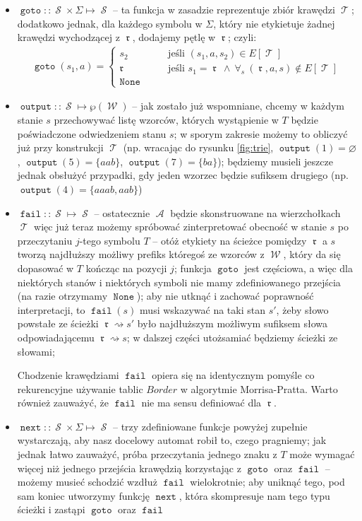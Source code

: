 \documentclass{article}
\let\emptyset\varnothing
\DeclareMathOperator{\rot}{\mathfrak{r}}
\DeclareMathOperator{\W}{\mathcal{W}}
\DeclareMathOperator{\A}{\mathcal{A}}
\DeclareMathOperator{\states}{\mathcal{S}}
\DeclareMathOperator{\trie}{\mathcal{T}}
\DeclareMathOperator{\goto}{\texttt{goto}}
\DeclareMathOperator{\next}{\texttt{next}}
\DeclareMathOperator{\fail}{\texttt{fail}}
\DeclareMathOperator{\out}{\texttt{output}}
\DeclareMathOperator{\none}{\texttt{None}}
\begin{document}
\begin{itemize}
    \item $\goto::\states\times\Sigma\mapsto\states$ -- ta funkcja w zasadzie reprezentuje zbiór krawędzi $\trie$; dodatkowo jednak, dla każdego symbolu w $\Sigma$, który nie etykietuje żadnej krawędzi wychodzącej z $\rot$, dodajemy pętlę w $\rot$; czyli:
    \begin{gather*}
        \goto(s_1, a)=\begin{cases}
        s_2 &\qquad \text{jeśli } (s_1,a,s_2)\in E[\trie] \\
        \rot &\qquad \text{jeśli } s_1=\rot\ \wedge\ \forall_{s}\ (\rot,a,s)\notin E[\trie] \\
        \none
        \end{cases}
    \end{gather*}

    \item $\out::\states\mapsto\wp(\W)$ -- jak zostało już wspomniane, chcemy w każdym stanie $s$ przechowywać listę wzorców, których wystąpienie w $T$ będzie poświadczone odwiedzeniem stanu $s$; w sporym zakresie możemy to obliczyć już przy konstrukcji $\trie$ (np. wracając do rysunku \ref{fig:trie}, $\out(1)=\emptyset$, $\out(5)=\{aab\}$, $\out(7)=\{ba\}$); będziemy musieli jeszcze jednak obsłużyć przypadki, gdy jeden wzorzec będzie sufiksem drugiego (np. $\out(4)=\{aaab, aab\}$)

    \item $\fail::\states\mapsto\states$ -- ostatecznie $\A$ będzie skonstruowane na wierzchołkach $\trie$ więc już teraz możemy spróbować zinterpretować obecność w stanie $s$ po przeczytaniu $j$-tego symbolu $T$ -- otóż etykiety na ścieżce pomiędzy $\rot$ a $s$ tworzą najdłuższy możliwy prefiks któregoś ze wzorców z $\W$, który da się dopasować w $T$ kończąc na pozycji $j$; funkcja $\goto$ jest częściowa, a więc dla niektórych stanów i niektórych symboli nie mamy zdefiniowanego przejścia (na razie otrzymamy $\none$); aby nie utknąć i zachować poprawność interpretacji, to $\fail(s)$ musi wskazywać na taki stan $s'$, żeby słowo powstałe ze ścieżki $\rot\rightsquigarrow s'$ było najdłuższym możliwym sufiksem słowa odpowiadającemu $\rot\rightsquigarrow s$; w dalszej części utożsamiać będziemy ścieżki ze słowami;

    Chodzenie krawędziami $\fail$ opiera się na identycznym pomyśle co rekurencyjne używanie tablic $Border$ w algorytmie Morrisa-Pratta. Warto również zauważyć, że $\fail$ nie ma sensu definiować dla $\rot$.

    \item $\next::\states\times\Sigma\mapsto\states$ -- trzy zdefiniowane funkcje powyżej zupełnie wystarczają, aby nasz docelowy automat robił to, czego pragniemy; jak jednak łatwo zauważyć, próba przeczytania jednego znaku z $T$ może wymagać więcej niż jednego przejścia krawędzią korzystając z $\goto$ oraz $\fail$ -- możemy musieć schodzić wzdłuż $\fail$ wielokrotnie; aby uniknąć tego, pod sam koniec utworzymy funkcję $\next$, która skompresuje nam tego typu ścieżki i zastąpi $\goto$ oraz $\fail$
\end{itemize}
\end{document}
